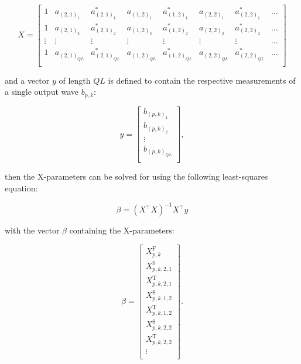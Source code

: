 \documentclass[../thesis/thesis.tex]{subfiles}
\begin{document}
\begin{refsection}
\begin{equation}
	X =
	\begin{bmatrix}
		1 & a_{(2,1)_1} & a^*_{(2,1)_1} & a_{(1,2)_1} & a^*_{(1,2)_1} & a_{(2,2)_1} & a^*_{(2,2)_1} & \dots \\
		1 & a_{(2,1)_2} & a^*_{(2,1)_2} & a_{(1,2)_2} & a^*_{(1,2)_2} & a_{(2,2)_2} & a^*_{(2,2)_2} & \dots \\
		\vdots & \vdots & \vdots & \vdots & \vdots & \vdots & \vdots & \dots \\
		1 & a_{(2,1)_{QL}} & a^*_{(2,1)_{QL}} & a_{(1,2)_{QL}} & a^*_{(1,2)_{QL}} & a_{(2,2)_{QL}} & a^*_{(2,2)_{QL}} & \dots \\
	\end{bmatrix}
\end{equation}

and a vector $y$ of length $QL$ is defined to contain the respective measurements of a single output wave $b_{p,k}$:

\begin{equation}
	y =
	\begin{bmatrix}
		b_{(p,k)_1} \\
		b_{(p,k)_2} \\
		\vdots \\
		b_{(p,k)_{QL}} \\
	\end{bmatrix},
\end{equation}

then the X-parameters can be solved for using the following least-squares equation:

\begin{equation}
	\beta = (X^\top X)^{-1}X^\top y
\end{equation}

with the vector $\beta$ containing the X-parameters:

\begin{equation}
	\beta = 
	\begin{bmatrix}
		X^\textrm{F}_{p,k} \\
		X^\textrm{S}_{p,k, 2, 1} \\
		X^\textrm{T}_{p,k, 2, 1} \\
		X^\textrm{S}_{p,k, 1, 2} \\
		X^\textrm{T}_{p,k, 1, 2} \\
		X^\textrm{S}_{p,k, 2, 2} \\
		X^\textrm{T}_{p,k, 2, 2} \\
		\vdots \\
	\end{bmatrix}.
\end{equation}


\end{refsection}
\end{document}
